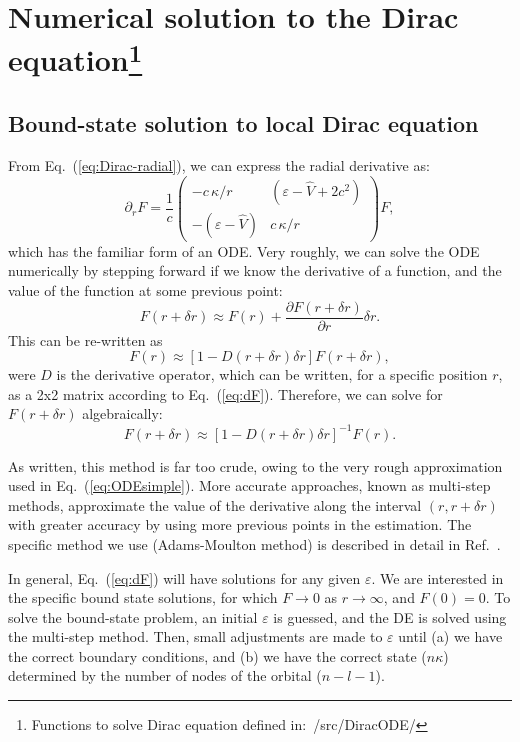 \documentclass[10pt,twocolumn,a4paper]{article}%
\newcommand{\matr}[4]{\ensuremath{\begin{pmatrix}#1&#2\\#3&#4\end{pmatrix}}}	%
\newcommand{\be}{\begin{equation}}
\newcommand{\ee}{\end{equation}}
\def\en{\ensuremath{\varepsilon}}
\def\p{\ensuremath{\partial}}
\renewcommand{\k}{\ensuremath{\kappa}}
\begin{document}
\section[Numerical solution to the Dirac equation]{Numerical solution to the Dirac equation\footnote{Functions to solve Dirac equation defined in:~/src/DiracODE/}}

\subsection{Bound-state solution to local Dirac equation}\label{sec:solveDirac}

From Eq.~(\ref{eq:Dirac-radial}), we can express the radial derivative as:
\be\label{eq:dF}
\p_r F  =\frac{1}{c} \matr 	{-c\,{\k}/{r}} 	{(\en - \hat V+2c^2)}  {-(\en - \hat V)} 	 {c\,{\k}/{r}}F,
\ee
which has the familiar form of an ODE.
Very roughly, we can solve the ODE numerically by stepping forward if we know the derivative of a function, and the value of the function at some previous point:
\be\label{eq:ODEsimple}
F(r+\delta r) \approx F(r) + \frac{\p F(r+\delta r)}{\p r}\delta r.
\ee
This can be re-written as
\[
F(r) \approx \left[1 - D(r+\delta r) \delta r\right]F(r+\delta r),
\]
were $D$ is the derivative operator, which can be written, for a specific position $r$, as a 2x2 matrix according to Eq.~(\ref{eq:dF}).
Therefore, we can solve for $ F(r+\delta r)$ algebraically:
\[
 F(r+\delta r) \approx \left[1 - D(r+\delta r) \delta r\right]^{-1} F(r) .
\]

As written, this method is far too crude, owing to the very rough approximation used in Eq.~(\ref{eq:ODEsimple}).
More accurate approaches, known as multi-step methods, approximate the value of the derivative along the interval $(r, r+\delta r)$ with greater accuracy by using more previous points in the estimation. %
%
The specific method we use (Adams-Moulton method)
 is described in detail in Ref.~\cite{JohnsonBook2007}.



In general, Eq.~(\ref{eq:dF}) will have solutions for any given $\en$. 
We are interested in the specific bound state solutions, for which $F\to0$ as $r\to\infty$, and $F(0)=0$.
To solve the bound-state problem, an initial $\en$ is guessed, and the DE is solved using the multi-step method.
Then, small adjustments are made to $\en$ until (a) we have the correct boundary conditions, and (b) we have the correct state ($n\k$) determined by the number of nodes of the orbital ($n-l-1$).
\end{document}
